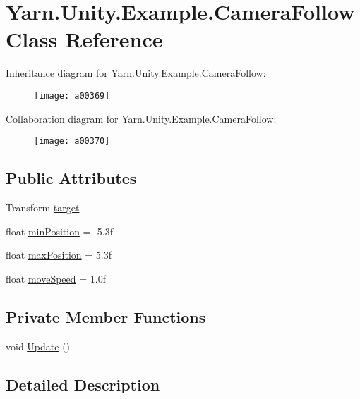 \hypertarget{a00037}{\section{Yarn.\-Unity.\-Example.\-Camera\-Follow Class Reference}
\label{a00037}
}


Inheritance diagram for Yarn.\-Unity.\-Example.\-Camera\-Follow\-:
\nopagebreak
\begin{figure}[H]
\begin{center}
\leavevmode
\texttt{[image: a00369]}
\end{center}
\end{figure}


Collaboration diagram for Yarn.\-Unity.\-Example.\-Camera\-Follow\-:
\nopagebreak
\begin{figure}[H]
\begin{center}
\leavevmode
\texttt{[image: a00370]}
\end{center}
\end{figure}
\subsection*{Public Attributes}
\begin{DoxyCompactItemize}
\item 
Transform \hyperlink{a00037_aa5d6958fb14a14ebb74e21c372fcca8b}{target}
\item 
float \hyperlink{a00037_a08c6f6c0ea423c21af99e4b5467d3c9b}{min\-Position} = -\/5.\-3f
\item 
float \hyperlink{a00037_abb0154dcbc2a7d43795beacd61a56de4}{max\-Position} = 5.\-3f
\item 
float \hyperlink{a00037_a3d4f2efe9c2cee8c7ff797cac03f27ec}{move\-Speed} = 1.\-0f
\end{DoxyCompactItemize}
\subsection*{Private Member Functions}
\begin{DoxyCompactItemize}
\item 
void \hyperlink{a00037_a592ddbf8e493bde0a6536c0234869217}{Update} ()
\end{DoxyCompactItemize}


\subsection{Detailed Description}


